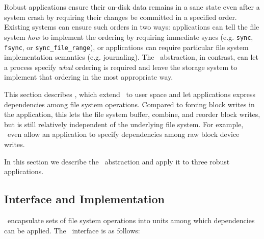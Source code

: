 \section{\Patchgroups}
\label{sec:patchgroup}

\newcommand{\pgCreate}{\texttt{pg\_create}}
\newcommand{\pgDepend}{\texttt{pg\_depend}}
\newcommand{\pgEngage}{\texttt{pg\_engage}}
\newcommand{\pgDisengage}{\texttt{pg\_disengage}}
\newcommand{\pgRelease}{\texttt{pg\_release}}
\newcommand{\pgSync}{\texttt{pg\_sync}}
\newcommand{\pgClose}{\texttt{pg\_close}}

Robust applications
%
ensure their on-disk data remains in a sane state even after a
system crash by requiring their changes be committed in
a specified order.
%
Existing systems can ensure such orders in two ways:
%
applications can tell the file system \emph{how} to implement the
ordering by requiring immediate syncs
(e.g. \texttt{sync}, \texttt{fsync}, or \texttt{sync\_file\_range}),
%
or applications can require particular file system implementation
semantics (e.g. journaling).
%
%
The \patch\ abstraction, in contrast, can let a process specify
\emph{what} ordering is required and leave the storage system to implement
that ordering in the most appropriate way.


This section describes \emph{\patchgroups}, which extend \patches\ to user
space and let applications express dependencies among file system
operations.
%
Compared to forcing block writes in the application, this lets the file
system buffer, combine, and reorder block writes, but is still relatively
independent of the underlying file system.
%
For example, \patchgroups\ even allow an application to specify
dependencies among raw block device writes.

In this section we describe the \patchgroup\ abstraction
%
and apply it to three robust applications.


\subsection{Interface and Implementation}
\label{sec:patchgroup:interface}

\Patchgroups\ encapsulate sets of file system operations into units among
which dependencies can be applied.
%
%
The \patchgroup\ interface is as follows:

